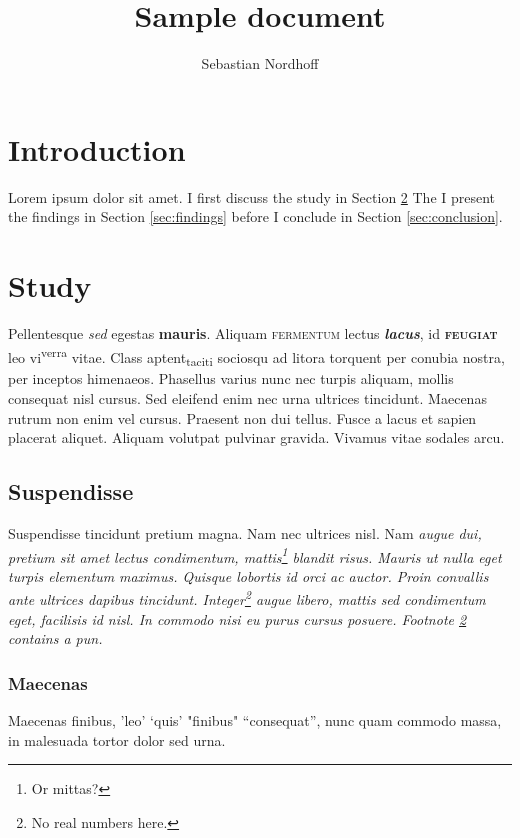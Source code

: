 \documentclass{scrartcl}
\author{Sebastian Nordhoff}
\title{Sample document}
\begin{document}
\maketitle

\tableofcontents
\section{Introduction}\label{sec:intro}
Lorem ipsum dolor sit amet. I first discuss the study in 
Section \ref{sec:study}
The I present the findings in 
Section \ref{sec:findings}
before I conclude in 
Section \ref{sec:conclusion}.

\section{Study}\label{sec:study}
Pellentesque \textit{sed} egestas \textbf{mauris}. Aliquam \textsc{fermentum} lectus \textit{\textbf{lacus}}, id \textbf{\textsc{feugiat}} leo vi\textsuperscript{verra} vitae. Class aptent\textsubscript{taciti} sociosqu ad litora torquent per conubia nostra, per inceptos himenaeos. Phasellus varius nunc nec turpis aliquam, mollis consequat nisl cursus. Sed eleifend enim nec urna ultrices tincidunt. Maecenas rutrum non enim vel cursus. Praesent non dui tellus. Fusce a lacus et sapien placerat aliquet. Aliquam volutpat pulvinar gravida. Vivamus vitae sodales arcu. 

\subsection{Suspendisse}
Suspendisse tincidunt \large pretium \LARGE magna. \tiny Nam \footnotesize nec ultrices nisl. \scriptsize Nam \itshape augue dui, \normalsize pretium \upshape  sit amet lectus condimentum, mattis\footnote{Or mittas?} blandit risus. Mauris ut nulla eget turpis elementum maximus. Quisque lobortis id orci ac auctor. Proin convallis ante ultrices dapibus tincidunt. Integer\footnote{\label{fn:integer}No real numbers here.} augue libero, mattis sed condimentum eget, facilisis id nisl. In commodo nisi eu purus cursus posuere. Footnote \ref{fn:integer} contains a pun. 

\subsubsection{Maecenas}
Maecenas finibus, 'leo' `quis' "finibus" ``consequat'', nunc quam commodo massa, in malesuada tortor dolor sed urna. 
\end{document}
